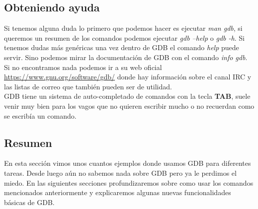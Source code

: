 \subsection{Obteniendo ayuda}
Si tenemos alguna duda lo primero que podemos hacer es ejecutar \emph{man gdb}, si queremos un resumen de los comandos podemos ejecutar \emph{gdb --help} o \emph{gdb -h}. Si tenemos dudas más genéricas una vez dentro de GDB el comando \emph{help} puede servir. Sino podemos mirar la documentación de GDB con el comando \emph{info gdb}. \\
Si no encontramos nada podemos ir a su web oficial \url{https://www.gnu.org/software/gdb/} donde hay información sobre el canal IRC y las listas de correo que también pueden ser de utilidad.\\
GDB tiene un sistema de auto-completado de comandos con la tecla \textbf{TAB}, suele venir muy bien para los vagos que no quieren escribir mucho o no recuerdan como se escribía un comando.


\subsection{Resumen}
En esta sección vimos unos cuantos ejemplos donde usamos GDB para diferentes tareas. Desde luego aún no sabemos nada sobre GDB pero ya le perdimos el miedo. En las siguientes secciones profundizaremos sobre como usar los comandos mencionados anteriormente y explicaremos algunas nuevas funcionalidades básicas de GDB. 